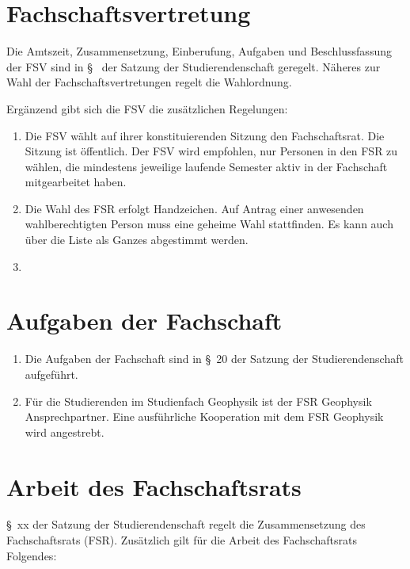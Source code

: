 \documentclass[
	a4paper,
	12pt,
	oneside,
	parskip=half-,
	pagesize,
	headsepline,
	german,
	ngerman
]{scrartcl}
\begin{document}
\section{Fachschaftsvertretung}
Die Amtszeit, Zusammensetzung, Einberufung, Aufgaben und Beschlussfassung der FSV sind in §~ der Satzung der Studierendenschaft geregelt. Näheres zur Wahl der Fachschaftsvertretungen regelt die Wahlordnung.

Ergänzend gibt sich die FSV die zusätzlichen Regelungen:
\begin{enumerate}
	\item Die FSV wählt auf ihrer konstituierenden Sitzung den Fachschaftsrat. Die Sitzung ist öffentlich. Der FSV wird empfohlen, nur Personen in den FSR zu wählen, die mindestens  jeweilige laufende Semester aktiv in der Fachschaft mitgearbeitet haben.
	\item Die Wahl des FSR erfolgt  Handzeichen. Auf Antrag einer anwesenden wahlberechtigten Person muss eine geheime Wahl stattfinden. Es kann auch über die Liste als Ganzes abgestimmt werden.
	\item {}
\end{enumerate}

\section{Aufgaben der Fachschaft}
\begin{enumerate}
	\item Die Aufgaben der Fachschaft sind in §~20 der Satzung der Studierendenschaft aufgeführt.
	\item Für die Studierenden im Studienfach Geophysik ist der FSR Geophysik Ansprechpartner. Eine ausführliche Kooperation mit dem FSR Geophysik wird angestrebt.
\end{enumerate}

\section{Arbeit  des Fachschaftsrats}
§~xx der Satzung der Studierendenschaft regelt die Zusammensetzung des Fachschaftsrats (FSR). Zusätzlich gilt für die Arbeit des Fachschaftsrats Folgendes:
\end{document}
